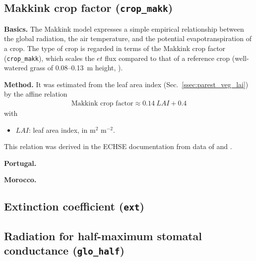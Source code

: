 \documentclass{scrreprt}
\newenvironment{denseitem}{
  \begin{itemize}
    \setlength{\itemsep}{0pt}
    \setlength{\parskip}{0pt}
    \setlength{\parsep}{0pt}
}{
  \end{itemize}
}
\begin{document}
\subsection{Makkink crop factor (\texttt{crop\_makk})} \label{ssec:parest_veg_cropmakk}

\textbf{Basics.}
The Makkink model expresses a simple empirical relationship between the global radiation, the air temperature, and the potential evapotranspiration of a crop.
The type of crop is regarded in terms of the Makkink crop factor (\verb!crop_makk!), which scales the $et$ flux compared to that of a reference crop (well-watered grass of 0.08--0.13~m height, \citealt{feddes87}).

\textbf{Method.}
It was estimated from the leaf area index (Sec.~\ref{ssec:parest_veg_lai}) by the affine relation
\begin{align} \label{eq:cropmakk}
  \text{Makkink~crop~factor} \approx 0.14 ~ LAI + 0.4
\end{align}
%
with
\begin{denseitem}
  \item[] $LAI$: leaf area index, in m$^2$ m$^{-2}$.
\end{denseitem}
%
This relation was derived in the ECHSE documentation from data of \citet{feddes87} and \citet{ludwig06}.

\textbf{Portugal.}

\textbf{Morocco.}

\subsection{Extinction coefficient (\texttt{ext})} \label{ssec:parest_veg_ext}

\subsection{Radiation for half-maximum stomatal conductance (\texttt{glo\_half})} \label{ssec:parest_veg_glohalf}
\end{document}
